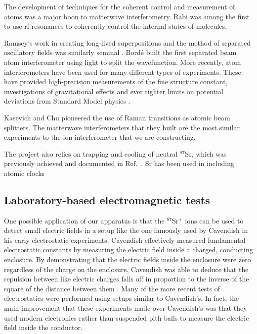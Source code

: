 The development of techniques for the coherent control and measurement of atoms was a major boon to matterwave interferometry\cite{Kronin_RMP}. Rabi was among the first to use rf resonances to coherently control the internal states of molecules\cite{RabiOriginal}\cite{Kronin_RMP}. 

Ramsey's work in creating long-lived superpositions and the method of separated oscillatory fields was similarly seminal \cite{Kronin_RMP}\cite{Ramsey_original}. 
Bord\'e built \cite{borde_interferometer} the first separated beam atom interferometer using light to split the wavefunction. 
More recently, atom interferometers have been used for many different types of experiments. These have provided high-precision measurements of the fine structure constant\cite{WichtFineStructure}\cite{WeissFineStructure}\cite{GibbleFineStructure}, investigations of gravitational effects \cite{mullerIsotropyGR}\cite{KasevichGravWaves} and ever tighter limits on potential deviations from Standard Model physics\cite{mullerLorentzInvarianceElectrodynamics}  \cite{Kronin_RMP}\cite{KasevichInertial}.

Kasevich and Chu pioneered the use of Raman transitions as atomic beam splitters\cite{kasevichChu1991}. The matterwave interferometers that they built are the most similar experiments to the ion interferometer that we are constructing. 

The project also relies on trapping and cooling of neutral $^{87}$Sr, which was previously achieved and documented in Ref.~\cite{kurosu_trap_sr}. Sr has been used in including atomic clocks \cite{ludlow_science}


\subsection{Laboratory-based electromagnetic tests}

One possible application of our apparatus is that the $^{87}$Sr$^+$ ions can be used to detect small electric fields in a setup like the one famously used by Cavendish in his early electrostatic experiments. Cavendish effectively measured fundamental electrostatic constants by measuring the electric field inside a charged, conducting enclosure. By demonstrating that the electric fields inside the enclosure were zero regardless of the charge on the enclosure, Cavendish was able to deduce that the repulsion between like electric charges falls off in proportion to the inverse of the square of the distance between them \cite{geodude}. Many of the more recent tests of electrostatics were performed using setups similar to Cavendish's\cite{jackson}.  In fact, the main improvement that these experiments made over Cavendish's was that they used modern electronics rather than suspended pith balls to measure the electric field inside the conductor.

